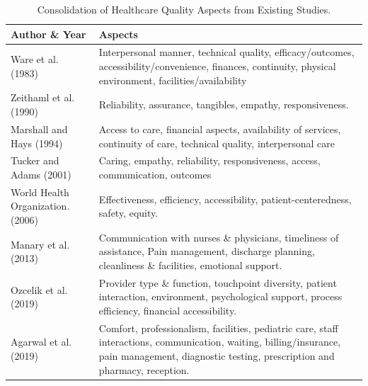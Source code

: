 \documentclass[journal,twoside,web]{ieeecolor}
\begin{document}
\begin{table}[htbp]
\centering
\caption{Consolidation of Healthcare Quality Aspects from Existing Studies.}
\label{tab:healthcare-quality}
\begin{tabular}{p{2.5cm}p{5.5cm}} %
\hline
\textbf{Author \& Year} & \textbf{Aspects} \\
\hline
Ware et al. (1983)\cite{ware1983defining} & Interpersonal manner, technical quality, efficacy/outcomes, accessibility/convenience, finances, continuity, physical environment, facilities/availability \\
\hline
Zeithaml et al. (1990)\cite{zeithaml1990delivering} & Reliability, assurance, tangibles, empathy, responsiveness. \\
\hline
Marshall and Hays (1994)\cite{marshall1994patient} & Access to care, financial aspects, availability of services, continuity of care, technical quality, interpersonal care \\
\hline
Tucker and Adams (2001)\cite{tucker2001incorporating} & Caring, empathy, reliability, responsiveness, access, communication, outcomes \\
\hline
World Health Organization. (2006)\cite{who2006quality} & Effectiveness, efficiency, accessibility, patient-centeredness, safety, equity. \\
\hline
Manary et al. (2013)\cite{manary2013patient} & Communication with nurses \& physicians, timeliness of assistance, Pain management, discharge planning, cleanliness \& facilities, emotional support. \\
\hline
Ozcelik et al. (2019)\cite{ozcelik2019customer} & Provider type \& function, touchpoint diversity, patient interaction, environment, psychological support, process efficiency, financial accessibility. \\
\hline
Agarwal et al. (2019)\cite{agarwal2019online} & Comfort, professionalism, facilities, pediatric care, staff interactions, communication, waiting, billing/insurance, pain management, diagnostic testing, prescription and pharmacy, reception. \\
\hline
\end{tabular}
\end{table}
\end{document}
